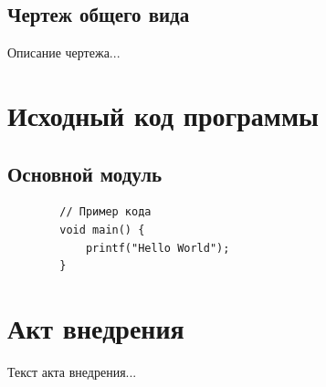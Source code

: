 \begin{appendices}
	\section{Чертеж общего вида}
	Описание чертежа...
	
	\chapter{Исходный код программы}
	\label{app:source_code}
	
	\section{Основной модуль}
	\begin{verbatim}
		// Пример кода
		void main() {
			printf("Hello World");
		}
	\end{verbatim}
	
	\chapter{Акт внедрения}
	\label{app:implementation}
	
	Текст акта внедрения...
	
\end{appendices}